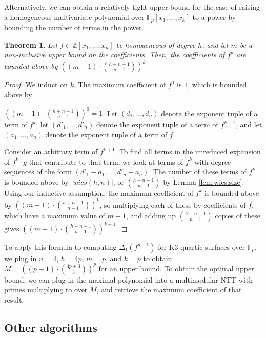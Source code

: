 \documentclass[a4paper]{article}
\newtheorem{thm}{Theorem}[section]
\theoremstyle{definition}
\theoremstyle{remark}
\begin{document}
Alternatively, we can obtain a relatively tight upper 
bound for the case of raising a homogeneous multivariate 
polynomial over $\mathbb{F}_p[x_1, \dots , x_k]$ to a power
by bounding the number of terms in the power. 

\begin{thm}
    Let $f \in \mathbb{Z}[x_1, \dots, x_n]$ be homogeneous of degree \(h\), 
    and let $m$ be a non-inclusive upper bound on the coefficients. 
    Then, the coefficients of $f ^ k$ are bounded above by 
    $\left((m - 1) \cdot \binom{h + n - 1}{n - 1}\right)^ k$
\end{thm}

\begin{proof}
    We induct on $k$. The maximum coefficient 
    of $f^0$ is $1$, which is bounded above by 
    
    \noindent$\left((m - 1) \cdot \binom{h + n - 1}{n - 1}\right)^ 0 = 1$.
    Let $(d_1, \dots , d_n)$ denote the exponent 
    tuple of a term of $f^k$, let $(d'_1, \dots , d'_n)$ 
    denote the exponent tuple of a term of 
    $f^{k + 1}$, and let $(a_1, \dots , a_n)$ 
    denote the exponent tuple of a term of $f$.

    Consider an arbitrary term of $f^{k + 1}$. 
    To find all terms in the unreduced 
    expansion of $f^k \cdot g$ that contribute 
    to that term, we look at 
    terms of $f^k$ with degree sequences of 
    the form $(d'_1 - a_1, \dots , d'_n - a_n)$. 
    The number of these terms of $f^k$ is bounded 
    above by $|wics(h, n)|$, or $\binom{h + n - 1}{n - 1}$ 
    by Lemma \ref{lem:wics:size}. Using our 
    inductive assumption, the maximum coefficient 
    of $f^k$ is bounded above by 
    $\left((m - 1) \cdot \binom{h + n - 1}{n - 1}\right)^ k$, 
    so multiplying each of these by coefficients 
    of $f$, which have a maximum value of 
    $m - 1$, and adding up $\binom{h + n - 1}{n - 1}$ 
    copies of these gives 
    $\left((m - 1) \cdot \binom{h + n - 1}{n - 1}\right)^{k + 1}$.
\end{proof}

To apply this formula to computing $\Delta_1(f^{p - 1})$ for K3 
quartic surfaces over $\mathbb{F}_p$, we plug in $n = 4$, $h = 4p$, $m = p$, 
and $k = p$ to obtain $M = \left((p - 1) \cdot \binom{4p + 3}{3}\right)^ p$
for an upper bound. To obtain the optimal upper bound, we can plug in the
maximal polynomial into a multimodular NTT with primes multiplying to over $M$,
and retrieve the maximum coefficient of that result.

\subsection{Other algorithms} \label{sec:poly:other}
\end{document}
